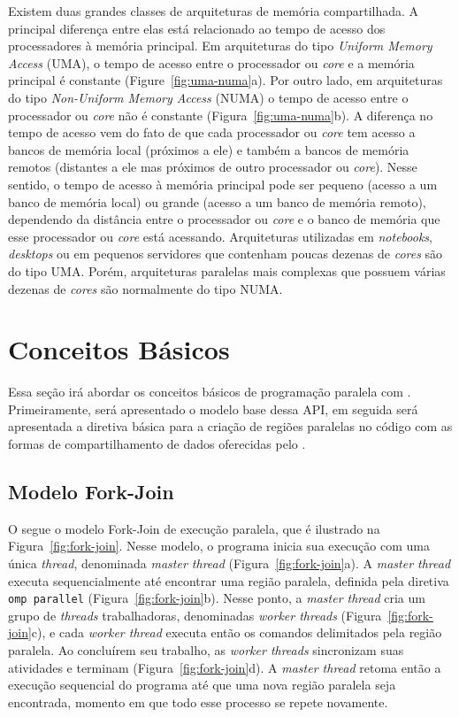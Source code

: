 \documentclass{SBCbookchapter}
\begin{document}
	Existem duas grandes classes de arquiteturas de memória
	compartilhada. A principal diferença entre elas está relacionado ao
	tempo de acesso dos processadores à memória principal. Em
	arquiteturas do tipo \textit{Uniform Memory Access} (UMA), o tempo
	de acesso entre o processador ou \textit{core} e a memória principal
	é constante (Figure~\ref{fig:uma-numa}a).  Por outro lado, em
	arquiteturas do tipo \textit{Non-Uniform Memory Access} (NUMA) o
	tempo de acesso entre o processador ou \textit{core} não é constante
	(Figura~\ref{fig:uma-numa}b). A diferença no tempo de acesso vem do
	fato de que cada processador ou \textit{core} tem acesso a bancos de
	memória local (próximos a ele) e também a bancos de memória remotos
	(distantes a ele mas próximos de outro processador ou
	\textit{core}). Nesse sentido, o tempo de acesso à memória principal
	pode ser pequeno (acesso a um banco de memória local) ou grande
	(acesso a um banco de memória remoto), dependendo da distância entre
	o processador ou \textit{core} e o banco de memória que esse
	processador ou \textit{core} está acessando.  Arquiteturas
	utilizadas em \textit{notebooks}, \textit{desktops} ou em pequenos
	servidores que contenham poucas dezenas de \textit{cores} são do
	tipo UMA. Porém, arquiteturas paralelas mais complexas que possuem
	várias dezenas de \textit{cores} são normalmente do tipo NUMA.

\section{Conceitos Básicos}

	Essa seção irá abordar os conceitos básicos de programação paralela com
	\openmp. Primeiramente, será apresentado o modelo base dessa API, em
	seguida será apresentada a diretiva básica para a criação de regiões
	paralelas no código com as formas de compartilhamento de dados
	oferecidas pelo \openmp.

	\subsection{Modelo Fork-Join}

		O \openmp segue o modelo Fork-Join de execução paralela, que é
		ilustrado na Figura~\ref{fig:fork-join}. Nesse modelo, o programa inicia sua
		execução com uma única \textit{thread}, denominada \textit{master thread}
		(Figura~\ref{fig:fork-join}a). A \textit{master thread} executa sequencialmente até
		encontrar uma região paralela, definida pela diretiva \texttt{omp parallel}
		(Figura~\ref{fig:fork-join}b). Nesse ponto, a \textit{master thread} cria um grupo
		de \textit{threads} trabalhadoras, denominadas \textit{worker threads}
		(Figura~\ref{fig:fork-join}c), e cada \textit{worker thread} executa então os
		comandos delimitados pela região paralela. Ao concluírem seu
		trabalho, as \textit{worker threads} sincronizam suas atividades e
		terminam (Figura~\ref{fig:fork-join}d). A \textit{master thread} retoma então a
		execução sequencial do programa até que uma nova região paralela
		seja encontrada, momento em que todo esse processo se repete
		novamente.
		
\end{document}
